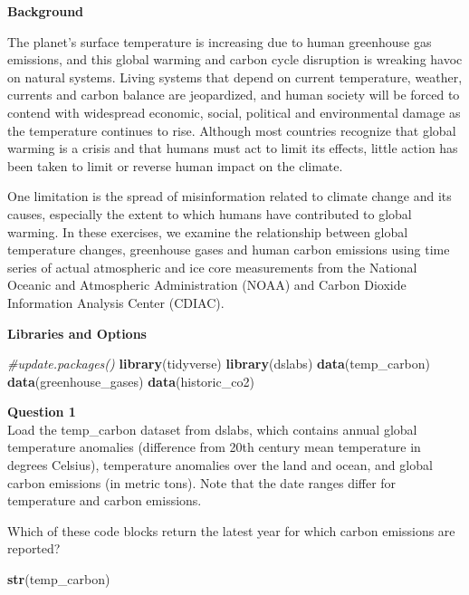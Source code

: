 \documentclass[
]{article}
\newenvironment{Shaded}{\begin{snugshade}}{\end{snugshade}}
\newcommand{\CommentTok}[1]{\textcolor[rgb]{0.56,0.35,0.01}{\textit{#1}}}
\newcommand{\KeywordTok}[1]{\textcolor[rgb]{0.13,0.29,0.53}{\textbf{#1}}}
\newcommand{\NormalTok}[1]{#1}
\begin{document}
\textbf{Background}

The planet's surface temperature is increasing due to human greenhouse
gas emissions, and this global warming and carbon cycle disruption is
wreaking havoc on natural systems. Living systems that depend on current
temperature, weather, currents and carbon balance are jeopardized, and
human society will be forced to contend with widespread economic,
social, political and environmental damage as the temperature continues
to rise. Although most countries recognize that global warming is a
crisis and that humans must act to limit its effects, little action has
been taken to limit or reverse human impact on the climate.

One limitation is the spread of misinformation related to climate change
and its causes, especially the extent to which humans have contributed
to global warming. In these exercises, we examine the relationship
between global temperature changes, greenhouse gases and human carbon
emissions using time series of actual atmospheric and ice core
measurements from the National Oceanic and Atmospheric Administration
(NOAA) and Carbon Dioxide Information Analysis Center (CDIAC).

\textbf{Libraries and Options}

\begin{Shaded}
\begin{Highlighting}[]
\CommentTok{#update.packages()}
\KeywordTok{library}\NormalTok{(tidyverse)}
\KeywordTok{library}\NormalTok{(dslabs)}
\KeywordTok{data}\NormalTok{(temp_carbon)}
\KeywordTok{data}\NormalTok{(greenhouse_gases)}
\KeywordTok{data}\NormalTok{(historic_co2)}
\end{Highlighting}
\end{Shaded}

\textbf{Question 1}\\
Load the temp\_carbon dataset from dslabs, which contains annual global
temperature anomalies (difference from 20th century mean temperature in
degrees Celsius), temperature anomalies over the land and ocean, and
global carbon emissions (in metric tons). Note that the date ranges
differ for temperature and carbon emissions.

Which of these code blocks return the latest year for which carbon
emissions are reported?

\begin{Shaded}
\begin{Highlighting}[]
\KeywordTok{str}\NormalTok{(temp_carbon)}
\end{Highlighting}
\end{Shaded}
\end{document}
